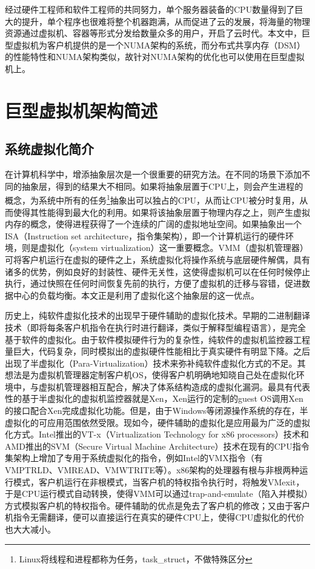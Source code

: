 经过硬件工程师和软件工程师的共同努力，单个服务器装备的CPU数量得到了巨大的提升，单个程序也很难将整个机器跑满，从而促进了云的发展，将海量的物理资源通过虚拟机、容器等形式分发给数量众多的用户，开启了云时代。本文中，巨型虚拟机为客户机提供的是一个NUMA架构的系统，而分布式共享内存（DSM）的性能特性和NUMA架构类似，故针对NUMA架构的优化也可以使用在巨型虚拟机上。
\section{巨型虚拟机架构简述}
\subsection{系统虚拟化简介}
在计算机科学中，增添抽象层次是一个很重要的研究方法。在不同的场景下添加不同的抽象层，得到的结果大不相同。如果将抽象层置于CPU上，则会产生进程的概念，为系统中所有的任务\footnote{Linux将线程和进程都称为任务，task\_struct，不做特殊区分}抽象出可以独占的CPU，从而让CPU被分时复用，从而使得其性能得到最大化的利用。如果将该抽象层置于物理内存之上，则产生虚拟内存的概念，使得进程获得了一个连续的广阔的虚拟地址空间。如果抽象出一个ISA（Instruction set architecture，指令集架构），即一个计算机运行的硬件环境，则是虚拟化（system virtualization）这一重要概念。VMM（虚拟机管理器）可将客户机运行在虚拟的硬件之上，系统虚拟化将操作系统与底层硬件解偶，具有诸多的优势，例如良好的封装性、硬件无关性\cite{sysv}，这使得虚拟机可以在任何时候停止执行，通过快照在任何时间恢复先前的执行，方便了虚拟机的迁移与容错，促进数据中心的负载均衡。本文正是利用了虚拟化这个抽象层的这一优点。

历史上，纯软件虚拟化技术的出现早于硬件辅助的虚拟化技术。早期的二进制翻译技术（即将每条客户机指令在执行时进行翻译，类似于解释型编程语言），是完全基于软件的虚拟化。由于软件模拟硬件行为的复杂性，纯软件的虚拟机监控器工程量巨大，代码复杂，同时模拟出的虚拟硬件性能相比于真实硬件有明显下降。之后出现了半虚拟化（Para-Virtualization）技术来弥补纯软件虚拟化方式的不足。其想法是为虚拟机管理器定制客户机OS，使得客户机明确地知晓自己处在虚拟化环境中，与虚拟机管理器相互配合，解决了体系结构造成的虚拟化漏洞。最具有代表性的基于半虚拟化的虚拟机监控器就是Xen\cite{artofxen}，Xen运行的定制的guest OS调用Xen的接口配合Xen完成虚拟化功能。但是，由于Windows等闭源操作系统的存在，半虚拟化的可应用范围依然受限。现如今，硬件辅助的虚拟化是应用最为广泛的虚拟化方式。Intel推出的VT-x（Virtualization Technology for x86 processors）技术\cite{intelv}和AMD推出的SVM（Secure Virtual Machine Architecture）技术\cite{amdv}在现有的CPU指令集架构上增加了专用于系统虚拟化的指令，例如Intel的VMX指令（有VMPTRLD、VMREAD、VMWTRITE等）\cite{intelSDM}。x86架构的处理器有根与非根两种运行模式，客户机运行在非根模式，当客户机的特权指令执行时，将触发VMexit，于是CPU运行模式自动转换，使得VMM可以通过trap-and-emulate（陷入并模拟）方式模拟客户机的特权指令。硬件辅助的优点是免去了客户机的修改；又由于客户机指令无需翻译，便可以直接运行在真实的硬件CPU上，使得CPU虚拟化的代价也大大减小。


